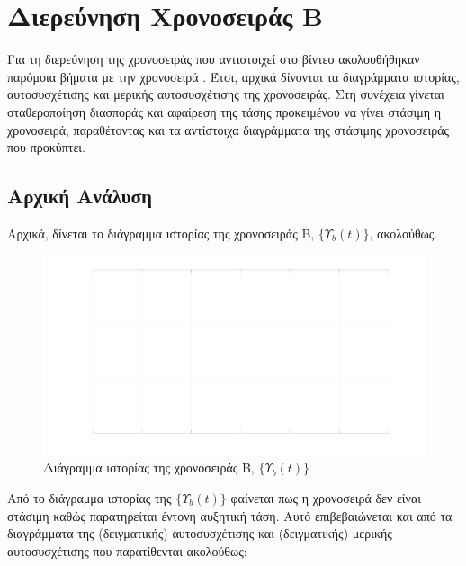 \chapter{Διερεύνηση Χρονοσειράς Β}
\label{ch:step3}
\setcounter{page}{1}
\thispagestyle{fancy}

Για τη διερεύνηση της χρονοσειράς  που αντιστοιχεί στο βίντεο  ακολουθήθηκαν παρόμοια βήματα με την χρονοσειρά . Έτσι, αρχικά δίνονται τα διαγράμματα ιστορίας, αυτοσυσχέτισης και μερικής αυτοσυσχέτισης της χρονοσειράς. Στη συνέχεια γίνεται σταθεροποίηση διασποράς και αφαίρεση της τάσης προκειμένου να γίνει στάσιμη η χρονοσειρά, παραθέτοντας και τα αντίστοιχα διαγράμματα της στάσιμης χρονοσειράς που προκύπτει.  

\section{Αρχική Ανάλυση}

Αρχικά, δίνεται το διάγραμμα ιστορίας της χρονοσειράς B, $\{Υ_b(t)\}$, ακολούθως.

\begin{figure}[H]
    \begin{center}
        \includegraphics[width=\textwidth]{plots/yb_history.svg.pdf}
        \caption{Διάγραμμα ιστορίας της χρονοσειράς B, $\{Υ_b(t)\}$}
        \label{fig:yb_history}
    \end{center}
\end{figure}

Από το διάγραμμα ιστορίας της $\{Υ_b(t)\}$ φαίνεται πως η χρονοσειρά δεν είναι στάσιμη καθώς παρατηρείται έντονη αυξητική τάση. Αυτό επιβεβαιώνεται και από τα διαγράμματα της (δειγματικής) αυτοσυσχέτισης και (δειγματικής) μερικής αυτοσυσχέτισης που παρατίθενται ακολούθως:

